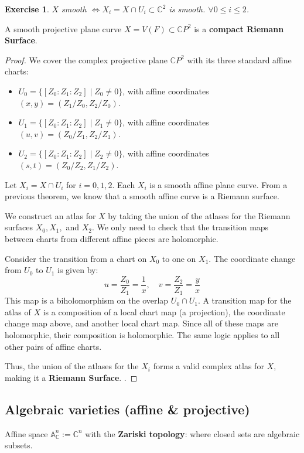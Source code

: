 \documentclass{article}
\newtheorem{exercise}{Exercise}
\begin{document}
\begin{exercise}
$X$ smooth $\iff X_i = X \cap U_i \subset \mathbb{C}^2$ is smooth. $\forall 0 \le i \le 2$.
\end{exercise}

\begin{theorem} \label{projplanecurvesarers}
A smooth projective plane curve $X = V(F) \subset \mathbb{C} P^2$ is a \textbf{compact Riemann Surface}.
\end{theorem}

\begin{proof}

We cover the complex projective plane $\mathbb{C}P^2$ with its three standard affine charts:
\begin{itemize}
    \item $U_0 = \{[Z_0:Z_1:Z_2] \mid Z_0 \neq 0\}$, with affine coordinates $(x,y) = (Z_1/Z_0, Z_2/Z_0)$.
    \item $U_1 = \{[Z_0:Z_1:Z_2] \mid Z_1 \neq 0\}$, with affine coordinates $(u,v) = (Z_0/Z_1, Z_2/Z_1)$.
    \item $U_2 = \{[Z_0:Z_1:Z_2] \mid Z_2 \neq 0\}$, with affine coordinates $(s,t) = (Z_0/Z_2, Z_1/Z_2)$.
\end{itemize}
Let $X_i = X \cap U_i$ for $i=0,1,2$. Each $X_i$ is a smooth affine plane curve. From a previous theorem, we know that a smooth affine curve is a Riemann surface.

We construct an atlas for $X$ by taking the union of the atlases for the Riemann surfaces $X_0, X_1,$ and $X_2$. We only need to check that the transition maps between charts from different affine pieces are holomorphic.

Consider the transition from a chart on $X_0$ to one on $X_1$. The coordinate change from $U_0$ to $U_1$ is given by:
$$ u = \frac{Z_0}{Z_1} = \frac{1}{x}, \quad v = \frac{Z_2}{Z_1} = \frac{y}{x} $$
This map is a biholomorphism on the overlap $U_0 \cap U_1$. A transition map for the atlas of $X$ is a composition of a local chart map (a projection), the coordinate change map above, and another local chart map. Since all of these maps are holomorphic, their composition is holomorphic. The same logic applies to all other pairs of affine charts.

Thus, the union of the atlases for the $X_i$ forms a valid complex atlas for $X$, making it a \textbf{Riemann Surface}.
.
\end{proof}


\subsection{Algebraic varieties (affine \& projective)}
Affine space $\mathbb{A}_{\mathbb{C}}^n := \mathbb{C}^n$ with the \textbf{Zariski topology}: where closed sets are algebraic subsets.
\end{document}
